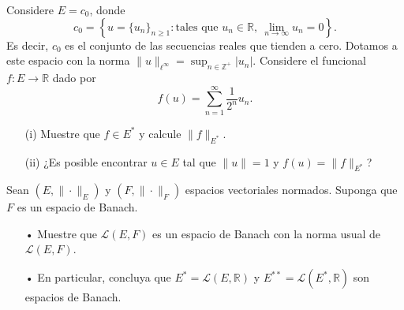
Considere $E = c_0$, donde
\[
c_0 = \left\{ u = \{u_n\}_{n \geq 1} :\text{tales que } u_n \in \mathbb{R}, \ \lim_{n \to \infty} u_n = 0 \right\}.
\]
Es decir, $c_0$ es el conjunto de las secuencias reales que tienden a cero. Dotamos a este espacio con la norma
$
\|u\|_{\ell^\infty} = \sup_{n \in \mathbb{Z}^+} |u_n|.
$
Considere el funcional $f : E \to \mathbb{R}$ dado por
\[
f(u) = \sum_{n=1}^{\infty} \frac{1}{2^n} u_n.
\]

\begin{enumerate}
    \item[(i)] Muestre que $f \in E^*$ y calcule $\|f\|_{E^*}$.
    \item[(ii)] ¿Es posible encontrar $u \in E$ tal que $\|u\| = 1$ y $f(u) = \|f\|_{E^*}$?
\end{enumerate}



Sean $(E, \| \cdot \|_E)$ y $(F, \| \cdot \|_F)$ espacios vectoriales normados. Suponga que $F$ es un espacio de Banach.

\begin{itemize}
    \item[•] Muestre que $\mathcal{L}(E, F)$ es un espacio de Banach con la norma usual de $\mathcal{L}(E, F)$.
    \item[•] En particular, concluya que $E^* = \mathcal{L}(E, \mathbb{R})$ y $E^{**} = \mathcal{L}(E^*, \mathbb{R})$ son espacios de Banach.
\end{itemize}
